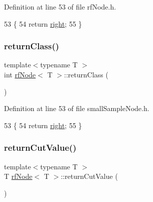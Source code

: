 Definition at line 53 of file rf\+Node.\+h.


\begin{DoxyCode}
53                                 \{
54             \textcolor{keywordflow}{return} \hyperlink{classrfNode_a01e57d43ac8af60d16880544e99ed965}{right};  
55         \}
\end{DoxyCode}
\mbox{\label{classrfNode_aa43edab3527a456028116928e83b123d}} 
\subsubsection{\texorpdfstring{return\+Class()}{returnClass()}\hspace{0.1cm}{\footnotesize\ttfamily [2/2]}}
{\footnotesize\ttfamily template$<$typename T $>$ \\
int \hyperlink{classrfNode}{rf\+Node}$<$ T $>$\+::return\+Class (\begin{DoxyParamCaption}{ }\end{DoxyParamCaption})\hspace{0.3cm}{\ttfamily [inline]}}



Definition at line 53 of file small\+Sample\+Node.\+h.


\begin{DoxyCode}
53                                 \{
54             \textcolor{keywordflow}{return} \hyperlink{classrfNode_a01e57d43ac8af60d16880544e99ed965}{right};  
55         \}
\end{DoxyCode}
\mbox{\label{classrfNode_a8d51a6acaff3d3dca74881b55743884f}} 
\subsubsection{\texorpdfstring{return\+Cut\+Value()}{returnCutValue()}\hspace{0.1cm}{\footnotesize\ttfamily [1/2]}}
{\footnotesize\ttfamily template$<$typename T $>$ \\
T \hyperlink{classrfNode}{rf\+Node}$<$ T $>$\+::return\+Cut\+Value (\begin{DoxyParamCaption}{ }\end{DoxyParamCaption})\hspace{0.3cm}{\ttfamily [inline]}}



